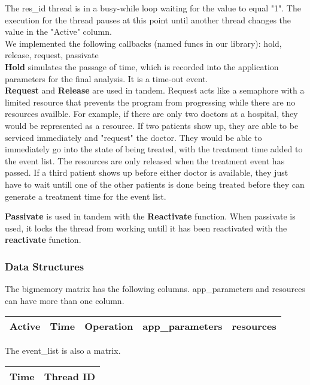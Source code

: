 \documentclass[fleqn]{article}
\begin{document}
The res\_id thread is in a busy-while loop waiting for the value to equal "1". The execution for the thread pauses at this point until another thread changes the value in the "Active" column.\\

We implemented the following callbacks (named funcs in our library): hold, release, request, passivate\\

\textbf{Hold} simulates the passage of time, which is recorded into the application parameters for the final analysis. It is a time-out event.\\

\textbf{Request}  and \textbf{Release} are used in tandem. Request acts like a semaphore with a limited resource that prevents the program from progressing while there are no resources availble. For example, if there are only two doctors at a hospital, they would be represented as a resource. If two patients show up, they are able to be serviced immediately and "request" the doctor. They would be able to immediately go into the state of being treated, with the treatment time added to the event list. The resources are only released when the treatment event has passed. If a third patient shows up before either doctor is available, they just have to wait untill one of the other patients is done being treated before they can generate a treatment time for the event list.

\textbf{Passivate} is used in tandem with the \textbf{Reactivate} function. When passivate is used, it locks the thread from working untill it has been reactivated with the \textbf{reactivate} function.
\subsubsection{Data Structures}

The bigmemory matrix has the following columns. app\_parameters and resources can have more than one column.
\begin{center}
\begin{tabular}{ |c| c |c|c|c|}
\hline
 Active & Time & Operation & app\_parameters & resources \\
\hline
\end{tabular}
\end{center}

The event\_list is also a matrix.
\begin{center}
\begin{tabular}{ |c| c |}
\hline
 Time & Thread ID  \\
\hline
\end{tabular}
\end{center}
\end{document}
